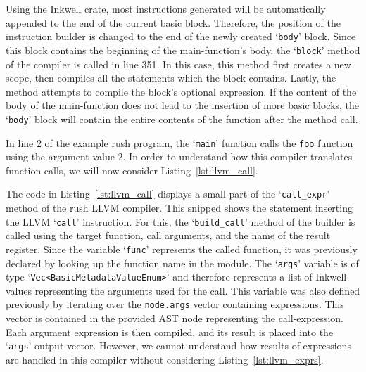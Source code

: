 Using the Inkwell crate, most instructions generated will be automatically appended to the end of the current basic block.
Therefore, the position of the instruction builder is changed to the end of the newly created `\texttt{body}' block.
Since this block contains the beginning of the main-function's body, the `\texttt{block}' method of the compiler is called in line 351.
In this case, this method first creates a new scope, then compiles all the statements which the block contains.
Lastly, the method attempts to compile the block's optional expression.
If the content of the body of the main-function does not lead to the insertion of more basic blocks,
the `\texttt{body}' block will contain the entire contents of the function after the method call.

In line 2 of the example rush program, the `\texttt{main}' function calls the \texttt{foo} function using the argument value 2.
In order to understand how this compiler translates function calls, we will now consider Listing~\ref{lst:llvm_call}.


The code in Listing~\ref{lst:llvm_call} displays a small part of the `\Verb|call_expr|' method of the rush LLVM compiler.
This snipped shows the statement inserting the LLVM `\texttt{call}' instruction.
For this, the `\Verb|build_call|' method of the builder is called using the target function, call arguments, and the name of the result register.
Since the variable `\texttt{func}' represents the called function, it was previously declared by looking up the function name in the module.
The `\texttt{args}' variable is of type `\Verb|Vec<BasicMetadataValueEnum>|' and therefore represents a list of Inkwell values representing the arguments used for the call.
This variable was also defined previously by iterating over the \texttt{node.args} vector containing expressions.
This vector is contained in the provided AST node representing the call-expression.
Each argument expression is then compiled, and its result is placed into the `\texttt{args}' output vector.
However, we cannot understand how results of expressions are handled in this compiler without considering Listing~\ref{lst:llvm_exprs}.


